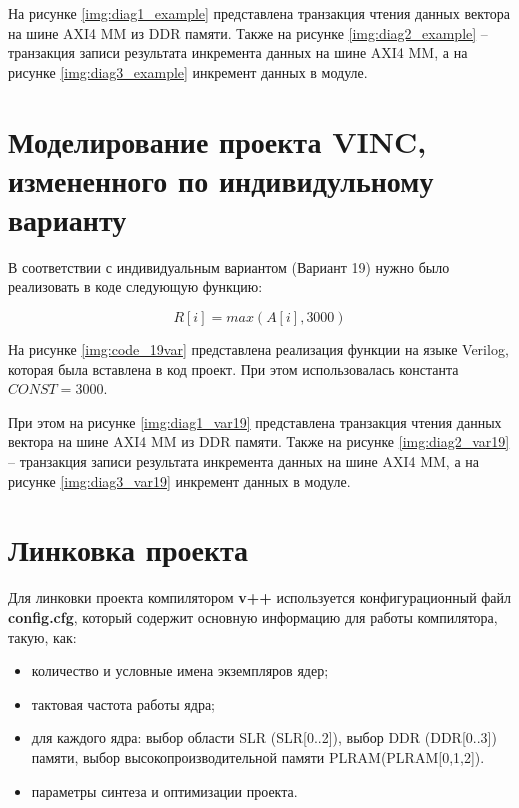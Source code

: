 На рисунке \ref{img:diag1_example} представлена транзакция чтения данных вектора на шине AXI4 MM из DDR памяти. Также на рисунке \ref{img:diag2_example} -- транзакция записи результата инкремента данных на шине AXI4 MM, а на рисунке \ref{img:diag3_example} инкремент данных в модуле.


\clearpage


\section{Моделирование проекта VINC, измененного по индивидульному варианту}

В соответствии с индивидуальным вариантом (Вариант 19) нужно было реализовать в коде следующую функцию:

\begin{equation}
	R[i] = max(A[i], 3000)
\end{equation}


На рисунке \ref{img:code_19var} представлена реализация функции на языке Verilog, которая была вставлена в код проект. При этом использовалась константа $CONST = 3000$.



При этом на рисунке \ref{img:diag1_var19} представлена транзакция чтения данных вектора на шине AXI4 MM из DDR памяти. Также на рисунке \ref{img:diag2_var19} -- транзакция записи результата инкремента данных на шине AXI4 MM, а на рисунке \ref{img:diag3_var19} инкремент данных в модуле.


\clearpage


\section{Линковка проекта}

Для линковки проекта компилятором \textbf{v++} используется конфигурационный файл \textbf{config.cfg}, который содержит основную информацию для работы компилятора, такую, как:
\begin{itemize}
	\item количество и условные имена экземпляров ядер;
	\item тактовая частота работы ядра;
	\item для каждого ядра: выбор области SLR (SLR[0..2]), выбор DDR (DDR[0..3]) памяти, выбор высокопроизводительной памяти PLRAM(PLRAM[0,1,2]).
	\item параметры синтеза и оптимизации проекта.
\end{itemize}

